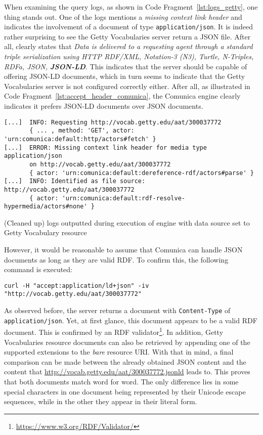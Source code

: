 When examining the query logs, as shown in Code Fragment~\ref{lst:logs_getty}, one thing stands out. One of the logs mentions a \textit{missing context link header} and indicates the involvement of a document of type \texttt{application/json}. It is indeed rather surprising to see the Getty Vocabularies server return a JSON file. After all, \citet{getty2023lod} clearly states that \textit{Data is delivered to a requesting agent through a standard triple serialization using HTTP RDF/XML, Notation-3 (N3), Turtle, N-Triples, RDFa, JSON, \textbf{JSON-LD}}. This indicates that the server should be capable of offering JSON-LD documents, which in turn seems to indicate that the Getty Vocabularies server is not configured correctly either. After all, as illustrated in Code Fragment~\ref{lst:accept_header_comunica}, the Comunica engine clearly indicates it prefers JSON-LD documents over JSON documents.

\begin{listing}[htbp]
    \begin{verbatim}
[...]  INFO: Requesting http://vocab.getty.edu/aat/300037772
       { ... , method: 'GET', actor: 'urn:comunica:default:http/actors#fetch' }
[...]  ERROR: Missing context link header for media type application/json
       on http://vocab.getty.edu/aat/300037772
       { actor: 'urn:comunica:default:dereference-rdf/actors#parse' }
[...]  INFO: Identified as file source: http://vocab.getty.edu/aat/300037772
       { actor: 'urn:comunica:default:rdf-resolve-hypermedia/actors#none' }
    \end{verbatim}
    \caption{(Cleaned up) logs outputted during execution of engine with data source set to Getty Vocabulary resource}
    \label{lst:logs_getty}
\end{listing}

However, it would be reasonable to assume that Comunica can handle JSON documents as long as they are valid RDF. To confirm this, the following command is executed:
\begin{flushleft}
    \texttt{curl -H "accept:application/ld+json" -iv "http://vocab.getty.edu/aat/300037772"}
\end{flushleft}
As observed before, the server returns a document with \texttt{Content-Type} of \texttt{application/json}. Yet, at first glance, this document appears to be a valid RDF document. This is confirmed by an RDF validator\footnote{\url{https://www.w3.org/RDF/Validator/}}. In addition, Getty Vocabularies resource documents can also be retrieved by appending one of the supported extensions to the \textit{bare} resource URI. With that in mind, a final comparison can be made between the already obtained JSON content and the content that \url{http://vocab.getty.edu/aat/300037772.jsonld} leads to. This proves that both documents match word for word. The only difference lies in some special characters in one document being represented by their Unicode escape sequences, while in the other they appear in their literal form.

